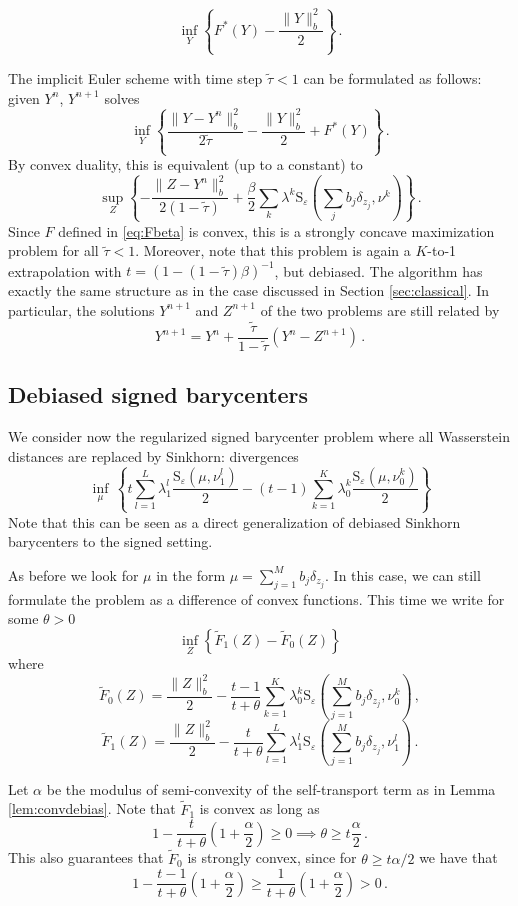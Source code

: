 \documentclass[12pt]{amsart}
\numberwithin{equation}{section}
\let\mr=\mathrm
\theoremstyle{plain}
\theoremstyle{definition}
\begin{document}
$$
\inf_Y \left\{ F^*(Y) - \frac{\|Y\|^2_b}{2}\right\}\,.
$$

The implicit Euler scheme with time step $\tilde{\tau} <1$ can be formulated as follows: given $Y^n$, $Y^{n+1}$ solves
\[
\inf_{Y} \left\{ \frac{\|Y - Y^n\|^2_b}{2\tilde{\tau}} - \frac{\|Y\|^2_b}{2}  + F^*(Y) \right\}\,.
\]
By convex duality, this is equivalent (up to a constant) to
\[
 \sup_Z \left\{ -\frac{\|Z - Y^n\|^2_b}{2(1-\tilde{\tau})} + \frac{\beta}{2} \sum_k \lambda^k \mr{S}_{\varepsilon}\left( \sum_{j} b_j \delta_{z_j}, \nu^k \right)  \right\}\,.
\]
Since $F$ defined in \eqref{eq:Fbeta} is convex, this is a strongly concave maximization problem for all $\tilde{\tau}<1$. Moreover, note that this problem is again a $K$-to-1 extrapolation with $t= (1-(1-\tilde{\tau})\beta)^{-1}$, but debiased. The algorithm has exactly the same structure as in the case discussed in Section \ref{sec:classical}.
In particular, the solutions $Y^{n+1}$ and $Z^{n+1}$ of the two problems are still related by
\[
Y^{n+1} = Y^{n} + \frac{\tilde{\tau}}{1-\tilde{\tau}} (Y^n - Z^{n+1})\,.
\]



\subsection{Debiased signed barycenters}\label{sec:debsignedbary}
We consider now the regularized signed barycenter problem where all Wasserstein distances are replaced by Sinkhorn: divergences
$$
\inf_{\mu} \, \left\{ t \sum_{l=1}^L \lambda_1^l \frac{ \mr{S}_\varepsilon\left(\mu, \nu_1^l \right)}{2} - (t-1)\sum_{k=1}^K\lambda_0^k \frac{\mr{S}_\varepsilon \left( \mu, \nu_0^k \right)}{2}\right\}
$$
Note that this can be seen as a direct generalization of debiased Sinkhorn barycenters \cite{janati2020debiased} to the signed setting.

As before we look for $\mu$ in the form $\mu = \sum_{j=1}^M b_j \delta_{z_j}$. In this case, we can still formulate the problem as a difference of convex functions. This time we write for some $\theta>0$
\[
\inf_{Z} \left\{ \tilde{F}_1(Z) - \tilde{F}_0(Z)\right\}
\]
where
\[
\tilde{F}_0(Z) =  \frac{\|Z\|_b^2}{2}  - \frac{t-1}{t+\theta} \sum_{k=1}^K \lambda_0^k \mr{S}_\varepsilon\left( \sum_{j=1}^M b_j \delta_{z_j}, \nu_0^k \right)\,, \]
\[
\tilde{F}_1(Z) = \frac{\|Z\|_b^2}{2} - \frac{t}{t+\theta}\sum_{l=1}^L \lambda_1^l \mr{S}_\varepsilon \left( \sum_{j=1}^M b_j \delta_{z_j}, \nu_1^l \right)\,.
\]

Let $\alpha$ be the modulus of semi-convexity of the self-transport term as in Lemma \ref{lem:convdebias}. Note that $\tilde{F}_1$ is convex as long as
\[
1 - \frac{t}{t+\theta}\left(1+\frac\alpha2\right) \geq 0 \implies \theta \geq t\frac{\alpha}{2}\,.
\]
This also guarantees that $\tilde{F}_0$ is strongly convex, since for $\theta \geq t\alpha/2$ we have that  
$$
1 - \frac{t-1}{t+\theta}\left(1+\frac\alpha2\right) \geq \frac{1}{t+\theta} \left(1+\frac\alpha2\right) > 0\,.
$$
\end{document}
